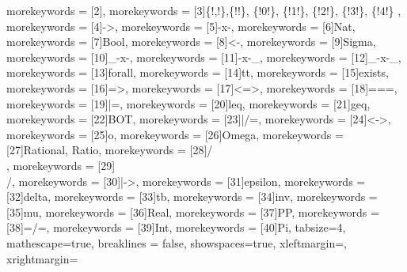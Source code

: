 {    morekeywords = [2]{},
    morekeywords = [3]{\{!,!\},\{!!\}, \{!0!\}, \{!1!\}, \{!2!\}, \{!3!\}, \{!4!\} },
    morekeywords = [4]{->},
    morekeywords = [5]{-x-},
    morekeywords = [6]{Nat},
    morekeywords = [7]{Bool},
    morekeywords = [8]{<-},
    morekeywords = [9]{Sigma},
    morekeywords = [10]{_-x-},
    morekeywords = [11]{-x-_},
    morekeywords = [12]{_-x-_},
    morekeywords = [13]{forall},
    morekeywords = [14]{tt},
    morekeywords = [15]{exists},
    morekeywords = [16]{=>},
    morekeywords = [17]{<=>},
    morekeywords = [18]{===},
    morekeywords = [19]{|=},
    morekeywords = [20]{leq},    
    morekeywords = [21]{geq}, 
    morekeywords = [22]{BOT},
    morekeywords = [23]{|/=},
    morekeywords = [24]{<->},
    morekeywords = [25]{o},
    morekeywords = [26]{Omega},
    morekeywords = [27]{Rational, Ratio},
    morekeywords = [28]{/\\},
    morekeywords = [29]{\\/},
    morekeywords = [30]{|->},
    morekeywords = [31]{epsilon},
    morekeywords = [32]{delta},
    morekeywords = [33]{tb},
    morekeywords = [34]{inv},
    morekeywords = [35]{mu},
    morekeywords = [36]{Real},
    morekeywords = [37]{PP},
    morekeywords = [38]{=/=},
    morekeywords = [39]{Int},
    morekeywords = [40]{Pi},
    tabsize=4,
    mathescape=true, 
    breaklines = false,
    showspaces=true,
    xleftmargin=\codeLeftMargin,
    xrightmargin=\codeLeftMargin
}

\makeatletter
\def\lst@visiblespace{\lst@ttfamily{\char32} } %
\makeatother


\newlength{\whatsleft}
\newcommand{\measureremainder}[1]{%
\begin{tikzpicture}[overlay,remember picture]
    \path let \p0 = (0,0), \p1 = (current page text area.east) in
        [/utils/exec={\pgfmathsetlength#1{\x1-\x0}\global#1=#1}];
\end{tikzpicture}%
}


